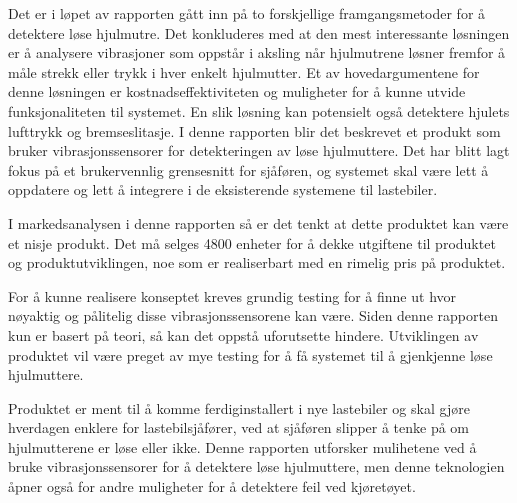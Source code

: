 Det er i løpet av rapporten gått inn på to forskjellige framgangsmetoder for å detektere
løse hjulmutre. Det konkluderes med at den mest interessante løsningen er å analysere
vibrasjoner som oppstår i aksling når hjulmutrene løsner fremfor å måle strekk eller trykk i 
hver enkelt hjulmutter. Et av hovedargumentene for denne løsningen er kostnadseffektiviteten og 
muligheter for å kunne utvide funksjonaliteten til systemet. En slik løsning kan potensielt 
også detektere hjulets lufttrykk og bremseslitasje. I denne rapporten blir det beskrevet et 
produkt som bruker vibrasjonssensorer for detekteringen av løse hjulmuttere.
Det har blitt lagt fokus på et brukervennlig grensesnitt for sjåføren, og systemet skal være
lett å oppdatere og lett å integrere i de eksisterende systemene til lastebiler. 

I markedsanalysen i denne rapporten så er det tenkt at dette produktet kan være et nisje produkt. 
Det må selges 4800 enheter for å dekke utgiftene til produktet og produktutviklingen, noe som
er realiserbart med en rimelig pris på produktet.

For å kunne realisere konseptet kreves grundig testing for å finne ut hvor nøyaktig og pålitelig 
disse vibrasjonssensorene kan være. Siden denne rapporten kun er basert på teori, så kan det 
oppstå uforutsette hindere. Utviklingen av produktet vil være preget av mye testing for å få 
systemet til å gjenkjenne løse hjulmuttere.

Produktet er ment til å komme ferdiginstallert i nye lastebiler og skal gjøre hverdagen enklere for 
lastebilsjåfører, ved at sjåføren slipper å tenke på om hjulmutterene er løse eller ikke. Denne
rapporten utforsker mulihetene ved å bruke vibrasjonssensorer for å detektere løse hjulmuttere,
men denne teknologien åpner også for andre muligheter for å detektere feil ved kjøretøyet.